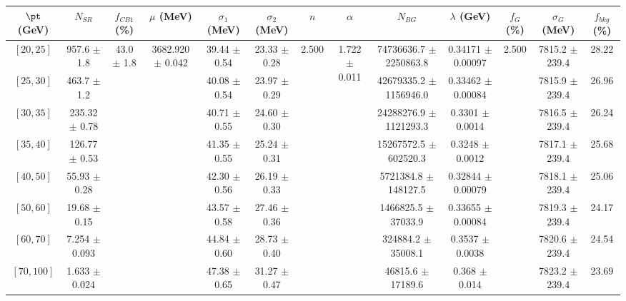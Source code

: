 \begin{tabular}{c||c|c|c|c|c|c|c|c|c|c|c||c}
$\pt$ (GeV) & $N_{SR}$ & $f_{CB1}$ (\%) & $\mu$ (MeV) & $\sigma_1$ (MeV) & $\sigma_2$ (MeV) & $n$ & $\alpha$ & $N_{BG}$ & $\lambda$ (GeV) & $f_G$ (\%) & $\sigma_G$ (MeV) & $f_{bkg}$ (\%) \\
\hline
$[20, 25]$ & 957.6 $\pm$ 1.8 & \multirow{8}{*}{43.0 $\pm$ 1.8} & \multirow{8}{*}{3682.920 $\pm$ 0.042} & 39.44 $\pm$ 0.54 & 23.33 $\pm$ 0.28 & \multirow{8}{*}{2.500} & \multirow{8}{*}{1.722 $\pm$ 0.011} & 74736636.7 $\pm$ 2250863.8 & 0.34171 $\pm$ 0.00097 & \multirow{8}{*}{2.500} & 7815.2 $\pm$ 239.4 & 28.22\\
$[25, 30]$ & 463.7 $\pm$ 1.2 &  &  & 40.08 $\pm$ 0.54 & 23.97 $\pm$ 0.29 &  &  & 42679335.2 $\pm$ 1156946.0 & 0.33462 $\pm$ 0.00084 &  & 7815.9 $\pm$ 239.4 & 26.96\\
$[30, 35]$ & 235.32 $\pm$ 0.78 &  &  & 40.71 $\pm$ 0.55 & 24.60 $\pm$ 0.30 &  &  & 24288276.9 $\pm$ 1121293.3 & 0.3301 $\pm$ 0.0014 &  & 7816.5 $\pm$ 239.4 & 26.24\\
$[35, 40]$ & 126.77 $\pm$ 0.53 &  &  & 41.35 $\pm$ 0.55 & 25.24 $\pm$ 0.31 &  &  & 15267572.5 $\pm$ 602520.3 & 0.3248 $\pm$ 0.0012 &  & 7817.1 $\pm$ 239.4 & 25.68\\
$[40, 50]$ & 55.93 $\pm$ 0.28 &  &  & 42.30 $\pm$ 0.56 & 26.19 $\pm$ 0.33 &  &  & 5721384.8 $\pm$ 148127.5 & 0.32844 $\pm$ 0.00079 &  & 7818.1 $\pm$ 239.4 & 25.06\\
$[50, 60]$ & 19.68 $\pm$ 0.15 &  &  & 43.57 $\pm$ 0.58 & 27.46 $\pm$ 0.36 &  &  & 1466825.5 $\pm$ 37033.9 & 0.33655 $\pm$ 0.00084 &  & 7819.3 $\pm$ 239.4 & 24.17\\
$[60, 70]$ & 7.254 $\pm$ 0.093 &  &  & 44.84 $\pm$ 0.60 & 28.73 $\pm$ 0.40 &  &  & 324884.2 $\pm$ 35008.1 & 0.3537 $\pm$ 0.0038 &  & 7820.6 $\pm$ 239.4 & 24.54\\
$[70, 100]$ & 1.633 $\pm$ 0.024 &  &  & 47.38 $\pm$ 0.65 & 31.27 $\pm$ 0.47 &  &  & 46815.6 $\pm$ 17189.6 & 0.368 $\pm$ 0.014 &  & 7823.2 $\pm$ 239.4 & 23.69\\
\end{tabular}
